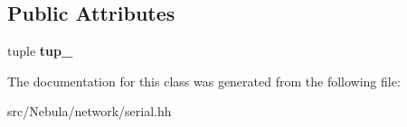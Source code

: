 \subsection*{Public Attributes}
\begin{DoxyCompactItemize}
\item 
\hypertarget{classgal_1_1network_1_1serial__ext_ac091f912da995c0f8dad27fc225f2fba}{tuple {\bfseries tup\-\_\-}}\label{classgal_1_1network_1_1serial__ext_ac091f912da995c0f8dad27fc225f2fba}

\end{DoxyCompactItemize}


The documentation for this class was generated from the following file\-:\begin{DoxyCompactItemize}
\item 
src/\-Nebula/network/serial.\-hh\end{DoxyCompactItemize}
